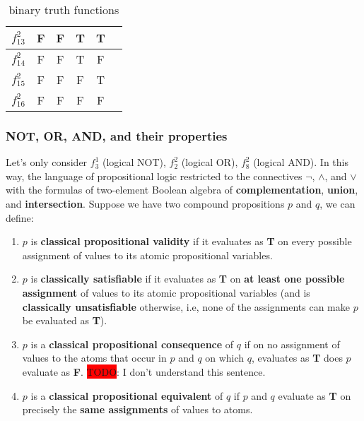 \documentclass[12pt, letterpaper]{article}
\begin{document}
\begin{table}[H]
\begin{tabular}{|c|c|c|c|c|c|}
    $f_{13}^2$ & F                      & F                      & T                      & T                      &         \\ [0.5ex] \hline
    $f_{14}^2$ & F                      & F                      & T                      & F                      &         \\ [0.5ex] \hline
    $f_{15}^2$ & F                      & F                      & F                      & T                      &         \\ [0.5ex] \hline
    $f_{16}^2$ & F                      & F                      & F                      & F                      &         \\ [0.5ex] \hline
  \end{tabular}
  \caption{binary truth functions}
  \label{table:binary_truth_functions}
\end{table}

\subsubsection{NOT, OR, AND, and their properties}

Let's only consider $f_3^1$ (logical NOT), $f_2^2$ (logical OR), $f_8^2$
(logical AND). In this way, the language of propositional logic restricted to
the connectives $\lnot$, $\land$, and $\lor$ with the formulas of two-element
Boolean algebra of \textbf{complementation}, \textbf{union}, and \textbf{
  intersection}. Suppose we have two compound propositions $p$ and $q$, we can
define:
\begin{enumerate}
  \item $p$ is \textbf{classical propositional validity} if it evaluates as
        \textbf{T} on every possible assignment of values to its atomic
        propositional variables.
  \item $p$ is \textbf{classically satisfiable} if it evaluates as \textbf{T}
        on \textbf{at least one possible assignment} of values to its atomic
        propositional variables (and is \textbf{classically unsatisfiable}
        otherwise, i.e, none of the assignments can make $p$ be evaluated as
        \textbf{T}).
  \item $p$ is a \textbf{classical propositional consequence} of $q$ if on no
        assignment of values to the atoms that occur in $p$ and $q$ on which $q$,
        evaluates as \textbf{T} does $p$ evaluate as \textbf{F}.
        \colorbox{red}{TODO}: I don't understand this sentence.
  \item $p$ is a \textbf{classical propositional equivalent} of $q$ if $p$ and
        $q$ evaluate as \textbf{T} on precisely the \textbf{same assignments} of
        values to atoms.
\end{enumerate}
\end{document}
